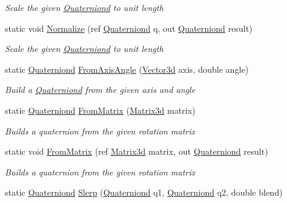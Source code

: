 \begin{DoxyCompactItemize}
\begin{DoxyCompactList}\small\item\em Scale the given \hyperlink{struct_open_t_k_1_1_quaterniond}{Quaterniond} to unit length \end{DoxyCompactList}\item 
static void \hyperlink{struct_open_t_k_1_1_quaterniond_a04e8b92436006c087fa2b28eabc81d11}{Normalize} (ref \hyperlink{struct_open_t_k_1_1_quaterniond}{Quaterniond} q, out \hyperlink{struct_open_t_k_1_1_quaterniond}{Quaterniond} result)
\begin{DoxyCompactList}\small\item\em Scale the given \hyperlink{struct_open_t_k_1_1_quaterniond}{Quaterniond} to unit length \end{DoxyCompactList}\item 
static \hyperlink{struct_open_t_k_1_1_quaterniond}{Quaterniond} \hyperlink{struct_open_t_k_1_1_quaterniond_a0c99a8bc420203f591b1605dcc5631ff}{From\-Axis\-Angle} (\hyperlink{struct_open_t_k_1_1_vector3d}{Vector3d} axis, double angle)
\begin{DoxyCompactList}\small\item\em Build a \hyperlink{struct_open_t_k_1_1_quaterniond}{Quaterniond} from the given axis and angle \end{DoxyCompactList}\item 
static \hyperlink{struct_open_t_k_1_1_quaterniond}{Quaterniond} \hyperlink{struct_open_t_k_1_1_quaterniond_ad416819a9221a7b6977757b0c020985a}{From\-Matrix} (\hyperlink{struct_open_t_k_1_1_matrix3d}{Matrix3d} matrix)
\begin{DoxyCompactList}\small\item\em Builds a quaternion from the given rotation matrix \end{DoxyCompactList}\item 
static void \hyperlink{struct_open_t_k_1_1_quaterniond_a1e62e3b50efd287bfca3a93a25e631a1}{From\-Matrix} (ref \hyperlink{struct_open_t_k_1_1_matrix3d}{Matrix3d} matrix, out \hyperlink{struct_open_t_k_1_1_quaterniond}{Quaterniond} result)
\begin{DoxyCompactList}\small\item\em Builds a quaternion from the given rotation matrix \end{DoxyCompactList}\item 
static \hyperlink{struct_open_t_k_1_1_quaterniond}{Quaterniond} \hyperlink{struct_open_t_k_1_1_quaterniond_a25a5935953cdf497cd5712ba14ea55f8}{Slerp} (\hyperlink{struct_open_t_k_1_1_quaterniond}{Quaterniond} q1, \hyperlink{struct_open_t_k_1_1_quaterniond}{Quaterniond} q2, double blend)

\end{DoxyCompactItemize}
